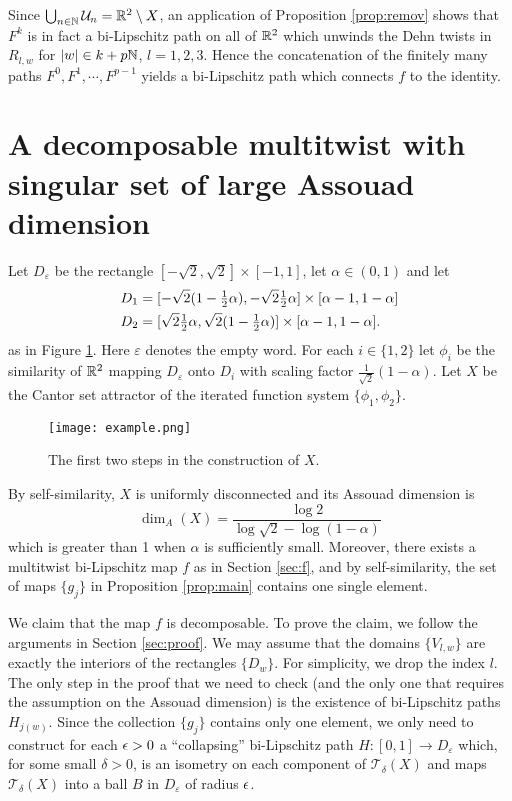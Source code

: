 \documentclass{amsart}
\begin{document}
Since $\bigcup_{n\in \mathbb{N} } \mathcal{U}_n = \mathbb{R}^2 \setminus X$, an application of Proposition \ref{prop:remov} shows that $F^k$ is in fact a bi-Lipschitz path on all of $\mathbb{R}^2$ which unwinds the Dehn twists in $R_{l,w}$ for $|w| \in k+p\mathbb{N}$, $l = 1,2,3$. Hence the concatenation of the finitely many paths $F^0, F^1, \cdots, F^{p-1}$ yields a bi-Lipschitz path which connects $f$ to the identity.




\section{A decomposable multitwist with singular set of large Assouad dimension}\label{sec:example}

Let $D_{\varepsilon}$ be the rectangle $[-\sqrt{2},\sqrt{2}]\times[-1,1]$, let $\alpha \in (0,1)$ and let
\begin{align*}
D_1 &= [-\sqrt{2}(1-\tfrac12\alpha), -\sqrt{2}\tfrac12\alpha] \times [\alpha-1,1-\alpha]\\
D_2 &= [\sqrt{2}\tfrac12\alpha, \sqrt{2}(1-\tfrac12\alpha)] \times [\alpha-1,1-\alpha].
\end{align*}
as in Figure \ref{fig:6}. Here $\varepsilon$ denotes the empty word. For each $i\in\{1,2\}$ let $\phi_i$ be the similarity of $\mathbb{R}^2$ mapping $D_{\varepsilon}$ onto $D_i$ with scaling factor $\frac1{\sqrt{2}}(1-\alpha)$. Let $X$ be the Cantor set attractor of the iterated function system $\{\phi_1,\phi_2\}$. 

\begin{figure}[h]
\begin{center}
\texttt{[image: example.png]}
\caption{The first two steps in the construction of $X$.}
\label{fig:6}
\end{center}
\end{figure}

By self-similarity, $X$ is uniformly disconnected and its Assouad dimension is 
\[ \dim_A(X) = \frac{\log{2}}{\log{\sqrt{2}}-\log(1-\alpha)}\]
which is greater than 1 when $\alpha$ is sufficiently small. Moreover, there exists a multitwist bi-Lipschitz map $f$ as in Section \ref{sec:f}, and by self-similarity, the set of maps $\{g_j\}$ in Proposition \ref{prop:main} contains one single element.

We claim that the map $f$ is decomposable. To prove the claim, we follow the arguments in Section \ref{sec:proof}. We may assume that the domains $\{V_{l,w}\}$ are exactly the interiors of the rectangles $\{D_w\}$. For simplicity, we drop the index $l$. The only step in the proof that we need to check (and the only one that requires the assumption on the Assouad dimension) is the existence of bi-Lipschitz paths $H_{j(w)}$. Since the collection $\{g_j\}$ contains only one element, we only need to construct for each $\epsilon>0$ a ``collapsing'' bi-Lipschitz path $H: [0,1] \to D_{\varepsilon}$ which, for some small $\delta>0$, is an isometry on each component of $\mathcal{T}_{\delta}(X)$ and maps $\mathcal{T}_{\delta}(X)$ into a ball $B$ in $D_{\varepsilon}$ of radius $\epsilon$.
\end{document}
